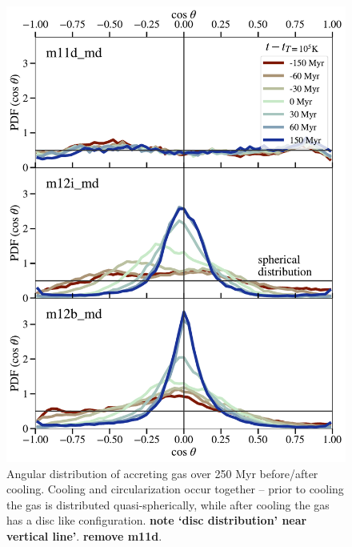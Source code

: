 \documentclass[fleqn,usenatbib]{mnras}
\begin{document}


\begin{figure}
    \centering
    \includegraphics[width=\columnwidth]{figures/theta_vs_t.pdf}
    \caption{
    Angular distribution of accreting gas over 250 Myr before/after cooling. Cooling and circularization occur together -- prior to cooling the gas is distributed quasi-spherically, while after cooling the gas has a disc like configuration.
    \textbf{note `disc distribution' near vertical line'}.
    \textbf{remove m11d}.
    }
    \label{f: theta vs R}
\end{figure}
\end{document}
